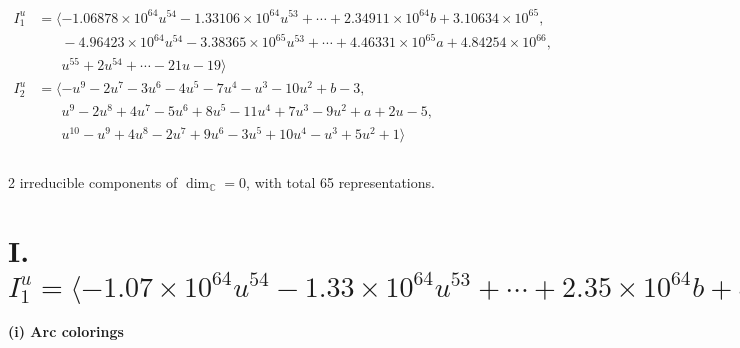 \documentclass[1p]{elsarticle_modified}
\theoremstyle{definition}
\begin{document}
\begin{align*}
I^u_{1}&=\langle 
-1.06878\times10^{64} u^{54}-1.33106\times10^{64} u^{53}+\cdots+2.34911\times10^{64} b+3.10634\times10^{65},\\
\phantom{I^u_{1}}&\phantom{= \langle  }-4.96423\times10^{64} u^{54}-3.38365\times10^{65} u^{53}+\cdots+4.46331\times10^{65} a+4.84254\times10^{66},\\
\phantom{I^u_{1}}&\phantom{= \langle  }u^{55}+2 u^{54}+\cdots-21 u-19\rangle \\
I^u_{2}&=\langle 
- u^9-2 u^7-3 u^6-4 u^5-7 u^4- u^3-10 u^2+b-3,\\
\phantom{I^u_{2}}&\phantom{= \langle  }u^9-2 u^8+4 u^7-5 u^6+8 u^5-11 u^4+7 u^3-9 u^2+a+2 u-5,\\
\phantom{I^u_{2}}&\phantom{= \langle  }u^{10}- u^9+4 u^8-2 u^7+9 u^6-3 u^5+10 u^4- u^3+5 u^2+1\rangle \\
\\
\end{align*}
\raggedright * 2 irreducible components of $\dim_{\mathbb{C}}=0$, with total 65 representations.\\
\newpage
\renewcommand{\arraystretch}{1}
\centering \section*{I. $I^u_{1}= \langle -1.07\times10^{64} u^{54}-1.33\times10^{64} u^{53}+\cdots+2.35\times10^{64} b+3.11\times10^{65},\;-4.96\times10^{64} u^{54}-3.38\times10^{65} u^{53}+\cdots+4.46\times10^{65} a+4.84\times10^{66},\;u^{55}+2 u^{54}+\cdots-21 u-19 \rangle$}
\flushleft \textbf{(i) Arc colorings}\\
\end{document}
